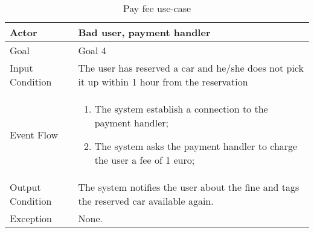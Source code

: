 \begin{table}[H]
\begin{center}
\begin{tabular}{p{} | p{}}
\hline
Actor & Bad user, payment handler\\
\hline
Goal & Goal 4\\
\hline
Input Condition & The user has reserved a car and he/she does not pick it up within 1 hour from the reservation\\
\hline
Event Flow & 
\begin{enumerate}
\item The system establish a connection to the payment handler;
\item The system asks the payment handler to charge the user a fee of 1 euro;
\end{enumerate} \\
\hline
Output Condition & The system notifies the user about the fine and tags the reserved car available again.\\
\hline
Exception & None.\\
\hline
\end{tabular}
\end{center}
\caption{Pay fee use-case}
\label{pay_fee_uc}
\end{table}